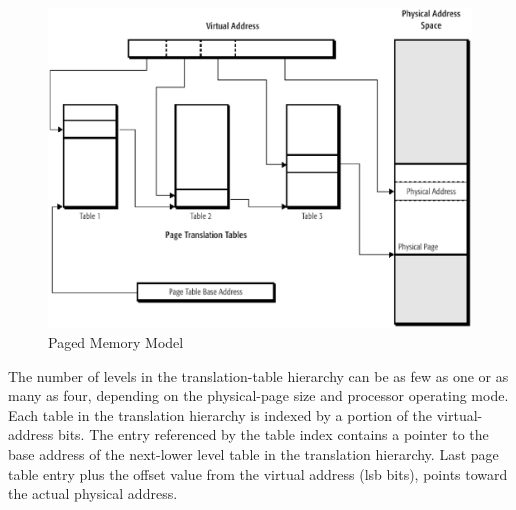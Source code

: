 \begin{figure}[H]
\centering
\includegraphics[scale=0.5]{./figures/paging.eps}
\caption{Paged Memory Model}
\label{fig:paging.eps}
\end{figure}



The number of levels in the translation-table hierarchy can be as few as one or as many as four, depending on the physical-page size and processor operating mode. Each table in the translation hierarchy is indexed by a portion of the virtual-address bits. The entry referenced by the table index contains a pointer to the base address of the next-lower level table in the translation hierarchy. Last page table entry plus the offset value from the virtual address (lsb bits), points toward the actual physical address.  

